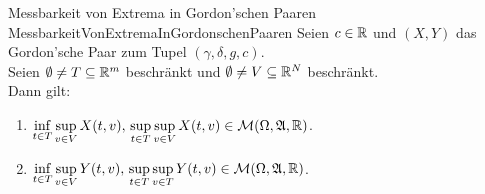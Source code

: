 \begin{satz}{Messbarkeit von Extrema in Gordon'schen Paaren}
            {MessbarkeitVonExtremaInGordonschenPaaren}
Seien $c \in \mathbb{R}$ und $(X,Y)$ das Gordon'sche Paar zum Tupel
$(\gamma,\delta,g,c)$.\\
Seien $\emptyset \neq T \subseteq \mathbb{R}^m$ beschränkt und
$\emptyset \neq V \subseteq \mathbb{R}^N$ beschränkt.\\
Dann gilt:
\begin{enumerate}[(1)]
	\item\label{MessbarkeitVonTeilextremaInGordonschenPaaren1}
	 $\underset{t \in T} \inf\, \underset{v \in V}\sup\, X(t, v), \, 
	\underset{t \in T} \sup\, \underset{v \in V}\sup\, X(t, v) \in 
	\mathcal{M}(\Omega, \mathfrak{A}, \mathbb{R})$.
	\item\label{MessbarkeitVonTeilextremaInGordonschenPaaren2}
	$\underset{t \in T} \inf\, \underset{v \in V}\sup\, Y(t, v), \, 
	\underset{t \in T} \sup\, \underset{v \in T}\sup\, Y(t, v) \in 
	\mathcal{M}(\Omega, \mathfrak{A}, \mathbb{R})$.
\end{enumerate}
\end{satz}
